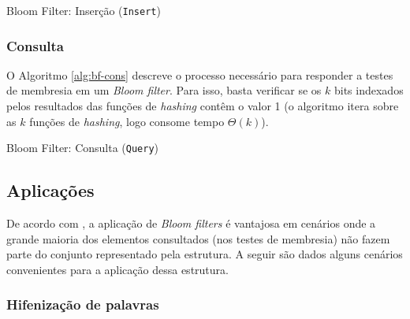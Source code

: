\documentclass[12pt,twoside,english,brazilian]{article}
\begin{document}
\begin{algorithm}
    \caption{Bloom Filter: Inserção (\texttt{Insert})}\label{alg:bf-ins}

\end{algorithm}

\subsubsection{Consulta}

O Algoritmo \ref{alg:bf-cons} descreve o processo necessário para responder a testes de membresia em um \textit{Bloom filter}. Para isso, basta verificar se os $k$ bits indexados pelos resultados das funções de \textit{hashing} contêm o valor 1 (o algoritmo itera sobre as $k$ funções de \textit{hashing}, logo consome tempo $\Theta(k)$).

\begin{algorithm}
    \caption{Bloom Filter: Consulta (\texttt{Query})}\label{alg:bf-cons}

\end{algorithm}

\subsection{Aplicações}

De acordo com \citet{bloom}, a aplicação de \textit{Bloom filters} é vantajosa em cenários onde a grande maioria dos elementos consultados (nos testes de membresia) não fazem parte do conjunto representado pela estrutura. A seguir são dados alguns cenários convenientes para a aplicação dessa estrutura.

\subsubsection{Hifenização de palavras}
\end{document}
